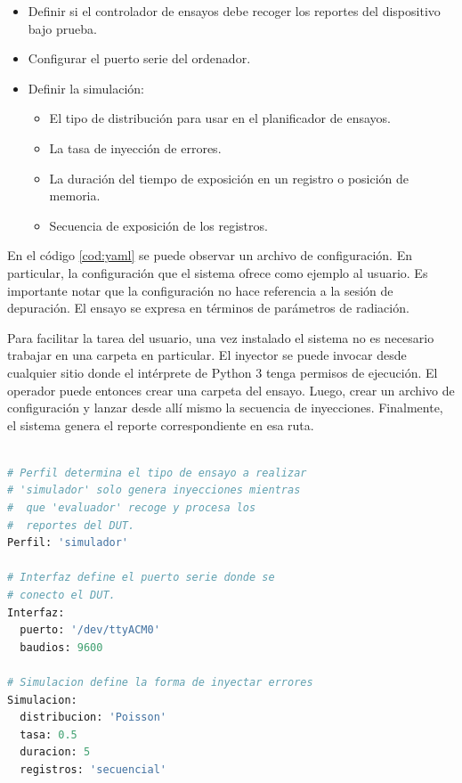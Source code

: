 \begin{itemize}
    \item Definir si el controlador de ensayos debe recoger los reportes del dispositivo bajo prueba.
    \item Configurar el puerto serie del ordenador.
    \item Definir la simulación:
        \begin{itemize}
            \item El tipo de distribución para usar en el planificador de ensayos.
            \item La tasa de inyección de errores.
            \item La duración del tiempo de exposición en un registro o posición de memoria.
            \item Secuencia de exposición de los registros.
        \end{itemize}
\end{itemize}


En el código \ref{cod:yaml} se puede observar un archivo de configuración.
En particular, la configuración que el sistema ofrece como ejemplo al usuario.
Es importante notar que la configuración no hace referencia a la sesión de depuración.
El ensayo se expresa en términos de parámetros de radiación.

Para facilitar la tarea del usuario, una vez instalado el sistema no es necesario trabajar en una carpeta en particular.
El inyector se puede invocar desde cualquier sitio donde el intérprete de Python 3 tenga permisos de ejecución.
El operador puede entonces crear una carpeta del ensayo.
Luego, crear un archivo de configuración y lanzar desde allí mismo la secuencia de inyecciones.
Finalmente, el sistema genera el reporte correspondiente en esa ruta.

\begin{lstlisting}[language=Python,label=cod:yaml,caption=Ejemplo de configuración de ensayo.]  % Start your code-block

# Perfil determina el tipo de ensayo a realizar
# 'simulador' solo genera inyecciones mientras
#  que 'evaluador' recoge y procesa los
#  reportes del DUT.
Perfil: 'simulador'

# Interfaz define el puerto serie donde se
# conecto el DUT.
Interfaz:
  puerto: '/dev/ttyACM0'
  baudios: 9600

# Simulacion define la forma de inyectar errores
Simulacion:
  distribucion: 'Poisson'
  tasa: 0.5
  duracion: 5
  registros: 'secuencial'

\end{lstlisting}

